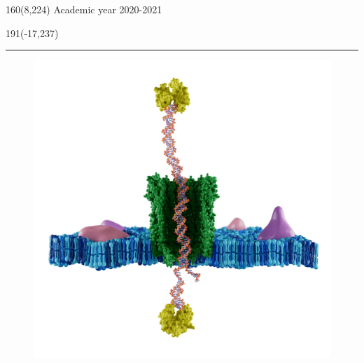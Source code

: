 %
\begin{textblock}{160}(8,224)
\textblockcolour{}
\vspace{-\parskip}
\flushright
Academic year 2020-2021
\end{textblock}
%
\begin{textblock}{191}(-17,237)
{\color{blueline}\rule{550pt}{5.5pt}}
\end{textblock}
%
\vspace*{5cm}
\begin{center}
    \begin{figure}[H]
        \centering
        \includegraphics[scale=0.091]{Figures/Coverphoto.png}
    \end{figure}
\end{center}
%
\vfill
